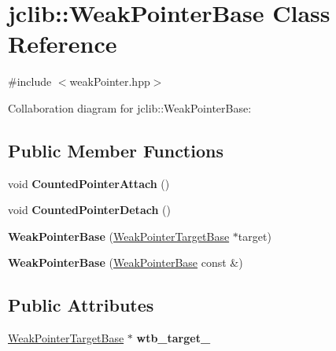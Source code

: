 \hypertarget{classjclib_1_1WeakPointerBase}{}\section{jclib\+:\+:Weak\+Pointer\+Base Class Reference}
\label{classjclib_1_1WeakPointerBase}


{\ttfamily \#include $<$weak\+Pointer.\+hpp$>$}



Collaboration diagram for jclib\+:\+:Weak\+Pointer\+Base\+:
\subsection*{Public Member Functions}
\begin{DoxyCompactItemize}
\item 
\mbox{\label{classjclib_1_1WeakPointerBase_a9f156bdc6a41637aceed27a7d639cb0f}} 
void {\bfseries Counted\+Pointer\+Attach} ()
\item 
\mbox{\label{classjclib_1_1WeakPointerBase_a759ae2ac85301bfdaf8a35c5ca003529}} 
void {\bfseries Counted\+Pointer\+Detach} ()
\item 
\mbox{\label{classjclib_1_1WeakPointerBase_a373d139ca23787d1469151d5944b3479}} 
{\bfseries Weak\+Pointer\+Base} (\hyperlink{classjclib_1_1WeakPointerTargetBase}{Weak\+Pointer\+Target\+Base} $\ast$target)
\item 
\mbox{\label{classjclib_1_1WeakPointerBase_aca4ab8c05b2c26f0de73922527aae4f0}} 
{\bfseries Weak\+Pointer\+Base} (\hyperlink{classjclib_1_1WeakPointerBase}{Weak\+Pointer\+Base} const \&)
\end{DoxyCompactItemize}
\subsection*{Public Attributes}
\begin{DoxyCompactItemize}
\item 
\mbox{\label{classjclib_1_1WeakPointerBase_a742a5672cd3e23e6b4a14ccd5a717a54}} 
\hyperlink{classjclib_1_1WeakPointerTargetBase}{Weak\+Pointer\+Target\+Base} $\ast$ {\bfseries wtb\+\_\+target\+\_\+}
\end{DoxyCompactItemize}


